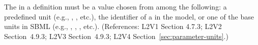 The  in a \Parameter definition must be a value chosen from
among the following: a predefined unit (e.g., , ,
etc.), the identifier of a \UnitDefinition in the model, or one of the
base units in SBML (e.g., , , ,
etc.).  (References: L2V1 Section 4.7.3; L2V2 Section~4.9.3; L2V3
Section~4.9.3; L2V4 Section~\ref{sec:parameter-units}.)
